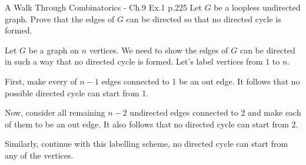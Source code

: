 \begin{problem}{}{}{A Walk Through Combinatorics - Ch.9 Ex.1 p.225}
    Let $G$ be a loopless undirected graph. Prove that the edges of $G$ 
    can be directed so that no directed cycle is formed.
\end{problem}

\begin{solution}
Let $G$ be a graph on $n$ vertices. We need to show the 
edges of $G$ can be directed in such a way that no directed cycle 
is formed. Let's label vertices from 1 to $n$. 

First, make every of $n-1$ edges connected to 1 be an out edge. 
It follows that no possible directed cycle can start from 1. 

Now, consider all remaining $n-2$ undirected edges connected to 2 
and make each of them to be an out edge. It also follows that no 
directed cycle can start from 2. 

Similarly, continue with this labelling scheme, no directed cycle 
can start from any of the vertices.
\end{solution}